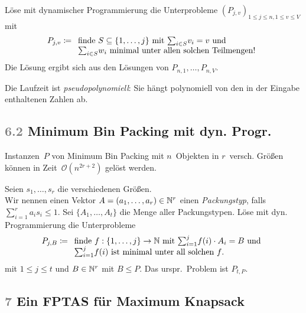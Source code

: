 \documentclass{cheat-sheet}
\renewcommand{\O}{\mathcal{O}} %
\newcommand{\Problem}[1]{\textcolor{ProblemColor}{\textbf{#1}}}
\newcommand{\scriptSection}[1]{\textcolor{gray}{#1}\enspace}
\begin{document}
\begin{alg}
  Löse mit dynamischer Programmierung die Unterprobleme $(P_{j,v})_{1 \leq j \leq n, 1 \leq v \leq V}$ mit
  \[
    P_{j,v} \coloneqq
      \begin{array}[t]{l}
        \text{finde $S \subseteq \{ 1, \ldots, j \}$ mit ${\sum}_{i \in S} v_i = v$ und} \\
        \text{${\sum}_{i \in S} w_i$ minimal unter allen solchen Teilmengen!}
      \end{array}
  \]
  Die Lösung ergibt sich aus den Lösungen von $P_{n,1}, \ldots, P_{n,V}$.
\end{alg}

\begin{bem}
  Die Laufzeit ist \emph{pseudopolynomiell}: Sie hängt polynomiell von den in der Eingabe enthaltenen Zahlen ab.
\end{bem}

\subsection{\scriptSection{6.2} \Problem{Minimum Bin Packing} mit dyn. Progr.}

\begin{satz}
  Instanzen~$P$ von Minimum Bin Packing mit $n$~Objekten in $r$~versch. Größen können in Zeit~$\O(n^{2r+2})$ gelöst werden.
\end{satz}

\begin{alg}
  Seien $s_1, \ldots, s_r$ die verschiedenen Größen. \\
  Wir nennen einen Vektor $A = (a_1, \ldots, a_r) \in \mathbb{N}^r$ einen \textit{Packungstyp}, falls ${\sum}_{i=1}^r a_i s_i \leq 1$.
  Sei $\{ A_1, \ldots, A_t \}$ die Menge aller Packungstypen.
  Löse mit dyn. Programmierung die Unterprobleme
  \[
    P_{j,B} \coloneqq
      \begin{array}[t]{l}
        \text{finde $f : \{ 1, \ldots, j \} \to \N$ mit ${\sum}_{i=1}^j f(i) \cdot A_i = B$ und} \\
        \text{${\sum}_{i=1}^j f(i)$ ist minimal unter all solchen $f$.}
      \end{array}
  \]
  mit $1 \leq j \leq t$ und $B \in \mathbb{N}^r$ mit $B \leq P$.
  Das urspr.\ Problem ist $P_{t,P}$.
\end{alg}


\subsection{\scriptSection{7} Ein FPTAS für \Problem{Maximum Knapsack}}
\end{document}
